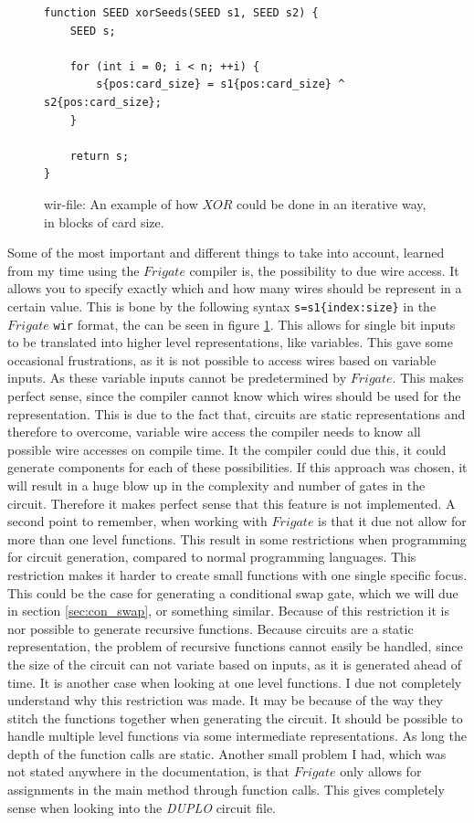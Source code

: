 \documentclass[twoside,11pt,openright]{report}
\newcommand{\DUPLO}{\textit{DUPLO} }
\begin{document}
\begin{figure}[t]
\begin{verbatim}
function SEED xorSeeds(SEED s1, SEED s2) {
    SEED s;
    
    for (int i = 0; i < n; ++i) {
        s{pos:card_size} = s1{pos:card_size} ^ s2{pos:card_size};
    }

    return s;
}
\end{verbatim}
\caption{wir-file: An example of how $XOR$ could be done in an iterative way, in blocks of card size.}
\label{fig:wir_ex}
\end{figure}

Some of the most important and different things to take into account, learned from my time using the $Frigate$ compiler is, the possibility to due wire access. It allows you to specify exactly which and how many wires should be represent in a certain value. This is bone by the following syntax \verb|s=s1{index:size}| in the $Frigate$ \verb|wir| format, the can be seen in figure \ref{fig:wir_ex}. This allows for single bit inputs to be translated into higher level representations, like variables. This gave some occasional frustrations, as it is not possible to access wires based on variable inputs. As these variable inputs cannot be predetermined by $Frigate$. This makes perfect sense, since the compiler cannot know which wires should be used for the representation. This is due to the fact that, circuits are static representations and therefore to overcome, variable wire access the compiler needs to know all possible wire accesses on compile time. It the compiler could due this, it could generate components for each of these possibilities. If this approach was chosen, it will result in a huge blow up in the complexity and number of gates in the circuit. Therefore it makes perfect sense that this feature is not implemented.
A second point to remember, when working with $Frigate$ is that it due not allow for more than one level functions. This result in some restrictions when programming for circuit generation, compared to normal programming languages. This restriction makes it harder to create small functions with one single specific focus. This could be the case for generating a conditional swap gate, which we will due in section \ref{sec:con_swap}, or something similar. 
Because of this restriction it is nor possible to generate recursive functions. Because circuits are a static representation, the problem of recursive functions cannot easily be handled, since the size of the circuit can not variate based on inputs, as it is generated ahead of time. 
It is another case when looking at one level functions. I due not completely understand why this restriction was made. It may be because of the way they stitch the functions together when generating the circuit. It should be possible to handle multiple level functions via some intermediate representations. As long the depth of the function calls are static.
Another small problem I had, which was not stated anywhere in the documentation, is that $Frigate$ only allows for assignments in the main method through function calls. This gives completely sense when looking into the \DUPLO circuit file.
\end{document}
